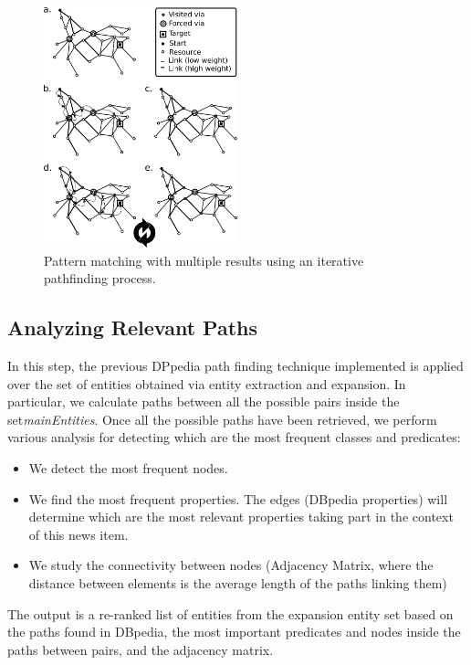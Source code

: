 \documentclass[a4paper,11pt]{report}
\begin{document}
\begin{figure}[h!]
\centering
\includegraphics[width=0.5\textwidth]{figure/graphmultipatternmatching.png}
\caption{Pattern matching with multiple results using an iterative pathfinding process.}
\label{fig:patternmatching}
\end{figure}

\subsection*{Analyzing Relevant Paths}
In this step, the previous DPpedia path finding technique implemented is applied over the set of entities obtained via entity extraction and expansion. In particular, we calculate paths between all the possible pairs inside the set\textit{mainEntities}. Once all the possible paths have been retrieved, we perform various analysis for detecting which are the most frequent classes and predicates:
\begin{itemize}
  \item We detect the most frequent nodes.
  \item We find the most frequent properties. The edges (DBpedia properties) will determine which are the most relevant properties taking part in the context of this news item.
  \item We study the connectivity between nodes (Adjacency Matrix, where the distance between elements is the average length of the paths linking them)
\end{itemize}

The output is a re-ranked list of entities from the expansion entity set based on the paths found in DBpedia, the most important predicates and nodes inside the paths between pairs, and the adjacency matrix.
\end{document}
